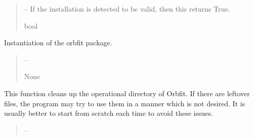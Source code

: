 \documentclass[letterpaper,11pt,english]{sphinxmanual}
\begin{document}
\begin{savenotes}
\begin{fulllineitems}
\begin{savenotes}
\begin{fulllineitems}
\begin{quote}
\begin{description}
\sphinxAtStartPar
{} – If the installation is detected to be valid, then this returns True.

\sphinxAtStartPar
bool

\end{description}\end{quote}

\end{fulllineitems}\end{savenotes}


\begin{savenotes}\begin{fulllineitems}
\label{\detokenize{code/opihiexarata.orbit.orbfit:opihiexarata.orbit.orbfit.OrbfitOrbitDeterminerEngine.__init__}}
\pysigstartsignatures
{}
\pysigstopsignatures
\sphinxAtStartPar
Instantiation of the orbfit package.
\begin{quote}\begin{description}
\sphinxAtStartPar
{} – 

\sphinxAtStartPar
None

\end{description}\end{quote}

\end{fulllineitems}\end{savenotes}


\begin{savenotes}\begin{fulllineitems}
\label{\detokenize{code/opihiexarata.orbit.orbfit:opihiexarata.orbit.orbfit.OrbfitOrbitDeterminerEngine._clean_orbfit_files}}
\pysigstartsignatures
{}
\pysigstopsignatures
\sphinxAtStartPar
This function cleans up the operational directory of Orbfit.
If there are leftover files, the program may try to use them in a
manner which is not desired. It is usually better to start from
scratch each time to avoid these issues.
\begin{quote}\begin{description}
\sphinxAtStartPar
{} – 


\end{description}
\end{quote}
\end{fulllineitems}
\end{savenotes}
\end{fulllineitems}
\end{savenotes}
\end{document}
